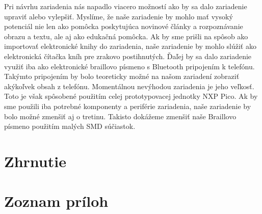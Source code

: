 \documentclass{template/socthesis}
\begin{document}
Pri návrhu zariadenia nás napadlo viacero možností ako by sa dalo zariadenie upraviť alebo vylepšiť. Myslíme, že naše zariadenie by mohlo mať vysoký potenciál nie len ako pomôcka poskytujúca novinové články a rozpoznávanie obrazu a textu, ale aj ako edukačná pomôcka. 
Ak by sme prišli na spôsob ako importovať elektronické knihy do zariadenia, naše zariadenie by mohlo slúžiť ako elektronická čítačka kníh pre zrakovo postihnutých. Ďaľej by sa dalo zariadenie využiť iba ako elektronické braillovo písmeno s Bluetooth pripojením k telefónu. Takýmto pripojením by bolo teoreticky možné na našom zariadení zobraziť akýkoľvek obsah z telefónu. 
Momentálnou nevýhodou zariadenia je jeho veľkosť. Toto je však spôsobené použitím celej prototypovacej jednotky NXP Pico. Ak by sme použili iba potrebné komponenty a periférie zariadenia, naše zariadenie by bolo možné zmenšiť aj o tretinu. Takisto dokážeme zmenšiť naše Braillovo písmeno použitím malých SMD súčiastok.

\newpage
\chapter*{Zhrnutie}
\newpage

\printbibliography[title=Zoznam použitej literatúry]
\newpage
{}

\chapter*{Zoznam príloh}
\newpage
\end{document}
